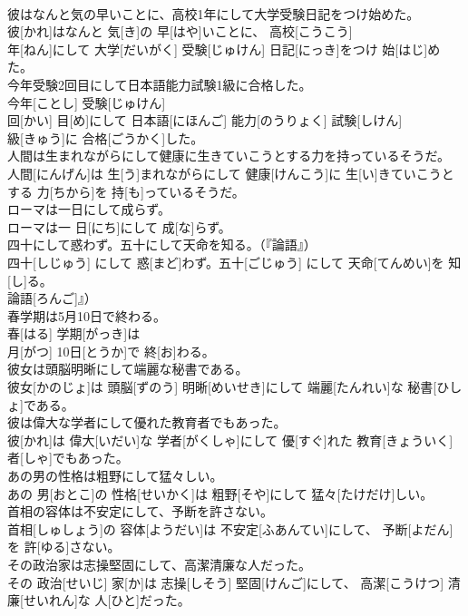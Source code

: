 \documentclass[8pt]{extreport}
\begin{document}
\begin{CJK}{UTF8}{min}
\\	彼はなんと気の早いことに、高校1年にして大学受験日記をつけ始めた。	
\\	彼[かれ]はなんと 気[き]の 早[はや]いことに、 高校[こうこう] 
\\	年[ねん]にして 大学[だいがく] 受験[じゅけん] 日記[にっき]をつけ 始[はじ]めた。
\\	今年受験2回目にして日本語能力試験1級に合格した。	
\\	今年[ことし] 受験[じゅけん] 
\\	回[かい] 目[め]にして 日本語[にほんご] 能力[のうりょく] 試験[しけん] 
\\	級[きゅう]に 合格[ごうかく]した。
\\	人間は生まれながらにして健康に生きていこうとする力を持っているそうだ。	
\\	人間[にんげん]は 生[う]まれながらにして 健康[けんこう]に 生[い]きていこうとする 力[ちから]を 持[も]っているそうだ。
\\	ローマは一日にして成らず。	
\\	ローマは一 日[にち]にして 成[な]らず。
\\	四十にして惑わず。五十にして天命を知る。（『論語』）	
\\	四十[しじゅう] にして 惑[まど]わず。五十[ごじゅう] にして 天命[てんめい]を 知[し]る。
\\	論語[ろんご]』）
\\	春学期は5月10日で終わる。	
\\	春[はる] 学期[がっき]は 
\\	月[がつ] 10日[とうか]で 終[お]わる。
\\	彼女は頭脳明晰にして端麗な秘書である。	
\\	彼女[かのじょ]は 頭脳[ずのう] 明晰[めいせき]にして 端麗[たんれい]な 秘書[ひしょ]である。
\\	彼は偉大な学者にして優れた教育者でもあった。	
\\	彼[かれ]は 偉大[いだい]な 学者[がくしゃ]にして 優[すぐ]れた 教育[きょういく] 者[しゃ]でもあった。
\\	あの男の性格は粗野にして猛々しい。	
\\	あの 男[おとこ]の 性格[せいかく]は 粗野[そや]にして 猛々[たけだけ]しい。
\\	首相の容体は不安定にして、予断を許さない。	
\\	首相[しゅしょう]の 容体[ようだい]は 不安定[ふあんてい]にして、 予断[よだん]を 許[ゆる]さない。
\\	その政治家は志操堅固にして、高潔清廉な人だった。	
\\	その 政治[せいじ] 家[か]は 志操[しそう] 堅固[けんご]にして、 高潔[こうけつ] 清廉[せいれん]な 人[ひと]だった。

\end{CJK}
\end{document}

